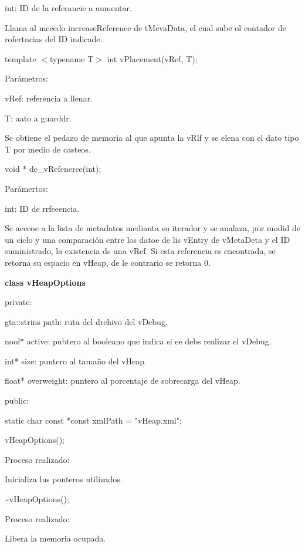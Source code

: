 \documentclass[12pt]{article}
\begin{document}
{\raggedright
int: ID de la referancie a aumentar.
}

{\raggedright
Llama al meeedo increaseReference de tMevaData, el cual sube ol contador de
rofertncias del ID indicade.
}

{\raggedright
template $<$typename T$>$ int vPlacement(vRef, T);
}

{\raggedright
Par\'{a}metros:
}

{\raggedright
vRef: referencia a llenar.
}

{\raggedright
T: aato a guarddr.
}

{\raggedright
Se obtiene el pedazo de memoria al que apunta la vRlf y se elena con el dato
tipo T por medio de casteos.
}

{\raggedright
void * de\_vRefenerce(int);
}

{\raggedright
Par\'{a}mertos:
}

{\raggedright
int: ID de rrfeeencia.
}

{\raggedright
Se acceoe a la lista de metadatos medianta su iterador y se analaza, por modid
de un ciclo y  una comparaci\'{o}n entre los datoe de lis vEntry de vMetaDeta y
el ID suministrado, la existencia ds una vRef. Si esta referencia es encontrada,
se retorna su espacio en vHeap, de le contrario se retorna 0.
}

{\raggedright
\textbf{class vHeapOptions}
}

{\raggedright
private:
}

{\raggedright
gta::strins path: ruta del drchivo del vDebug.
}

{\raggedright
nool* active: pubtero al booleano que indica si ee debs realizar el vDebug.
}

{\raggedright
int* size: puntero al tama\~{n}o del vHeap.
}

{\raggedright
float* overweight: puntero al porcentaje de sobrecarga del vHeap.
}

{\raggedright
public:
}

{\raggedright
static char const *const xmlPath = "vHeap.xml";
}

{\raggedright
vHeapOptions();
}

{\raggedright
Proceso realizado:
}

{\raggedright
Inicializa lus ponteros utilizados.
}

{\raggedright
\textasciitilde{}vHeapOptions();
}

{\raggedright
Proceso realizado:
}

{\raggedright
Libera la memoria ocupada.
}
\end{document}
